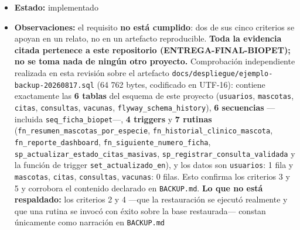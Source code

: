 \documentclass[
  spanish,
]{article}
\begin{document}
\begin{itemize}
  ejemplo), \texttt{docs/\allowbreak{}despliegue/\allowbreak{}RUNBOOK.\allowbreak{}md} y \texttt{DEPLOYMENT.\allowbreak{}md}
  (operación del despliegue), \texttt{render.\allowbreak{}yaml} (servicio de base de
  datos gestionado), rutinas de \texttt{db/\allowbreak{}procs/} que sobreviven a la
  restauración (REQ-NF-013), migraciones Flyway en
  \texttt{Backend/\allowbreak{}src/\allowbreak{}main/\allowbreak{}resources/\allowbreak{}db/\allowbreak{}migration/}.
\item
  \textbf{Estado:} implementado
\item
  \textbf{Observaciones:} el requisito \textbf{no está cumplido}: dos de
  sus cinco criterios se apoyan en un relato, no en un artefacto
  reproducible. \textbf{Toda la evidencia citada pertenece a este
  repositorio (ENTREGA-FINAL-BIOPET); no se toma nada de ningún otro
  proyecto.} Comprobación independiente realizada en esta revisión sobre
  el artefacto \texttt{docs/\allowbreak{}despliegue/\allowbreak{}ejemplo-\allowbreak{}backup-\allowbreak{}20260817.\allowbreak{}sql} (64
  762 bytes, codificado en UTF-16): contiene exactamente las \textbf{6
  tablas} del esquema de este proyecto (\texttt{usuarios},
  \texttt{mascotas}, \texttt{citas}, \texttt{consultas},
  \texttt{vacunas}, \texttt{flyway\_\allowbreak{}schema\_\allowbreak{}hist\allowbreak{}ory}), \textbf{6
  secuencias} ---incluida \texttt{seq\_\allowbreak{}ficha\_\allowbreak{}biopet}---, \textbf{4
  triggers} y \textbf{7 rutinas}
  (\texttt{fn\_\allowbreak{}resumen\_\allowbreak{}mascota\allowbreak{}s\_\allowbreak{}por\_\allowbreak{}especie},
  \texttt{fn\_\allowbreak{}historial\_\allowbreak{}clini\allowbreak{}co\_\allowbreak{}mascota},
  \texttt{fn\_\allowbreak{}reporte\_\allowbreak{}dashboa\allowbreak{}rd},
  \texttt{fn\_\allowbreak{}siguiente\_\allowbreak{}numer\allowbreak{}o\_\allowbreak{}ficha},
  \texttt{sp\_\allowbreak{}actualizar\_\allowbreak{}esta\allowbreak{}do\_\allowbreak{}citas\_\allowbreak{}masivas},
  \texttt{sp\_\allowbreak{}registrar\_\allowbreak{}consu\allowbreak{}lta\_\allowbreak{}validada} y la función de trigger
  \texttt{set\_\allowbreak{}actualizado\_\allowbreak{}en}), y los datos son \texttt{usuarios}: 1
  fila y \texttt{mascotas}, \texttt{citas}, \texttt{consultas},
  \texttt{vacunas}: 0 filas. Esto confirma los criterios 3 y 5 y
  corrobora el contenido declarado en \texttt{BACKUP.\allowbreak{}md}. \textbf{Lo que
  no está respaldado:} los criterios 2 y 4 ---que la restauración se
  ejecutó realmente y que una rutina se invocó con éxito sobre la base
  restaurada--- constan únicamente como narración en \texttt{BACKUP.\allowbreak{}md}

\end{itemize}
\end{document}

